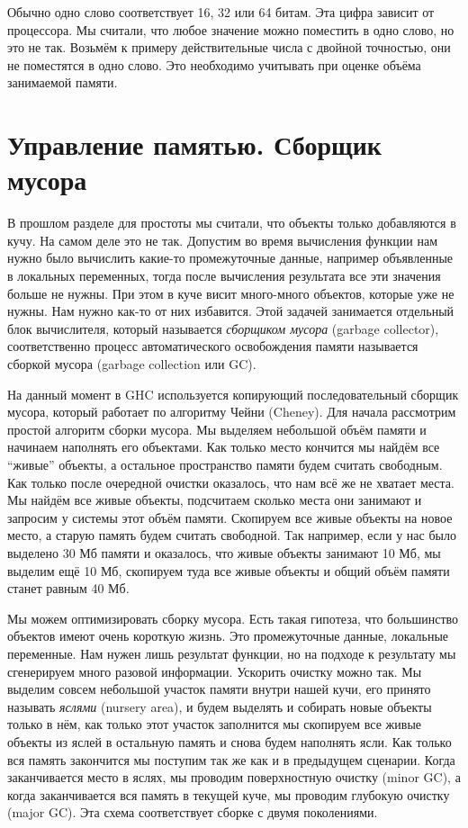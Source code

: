 Обычно одно слово соответствует 16, 32 или 64 битам. Эта цифра зависит
от процессора. Мы считали, что любое значение можно поместить в одно
слово, но это не так. Возьмём к примеру действительные числа с двойной
точностью, они не поместятся в одно слово. Это необходимо учитывать при
оценке объёма занимаемой памяти.

\section{Управление памятью. Сборщик мусора}

В прошлом разделе для простоты мы считали, что объекты только
добавляются в кучу. На самом деле это не так. Допустим во время
вычисления функции нам нужно было вычислить какие-то промежуточные
данные, например объявленные в локальных переменных, тогда после
вычисления результата все эти значения больше не нужны. При этом в куче
висит много-много объектов, которые уже не нужны. Нам нужно как-то от
них избавится. Этой задачей занимается отдельный блок вычислителя,
который называется \emph{сборщиком мусора} (garbage collector),
соответственно процесс автоматического освобождения памяти называется
сборкой мусора (garbage collection или GC).

На данный момент в GHC используется копирующий последовательный сборщик
мусора, который работает по алгоритму Чейни (Cheney). Для начала
рассмотрим простой алгоритм сборки мусора. Мы выделяем небольшой объём
памяти и начинаем наполнять его объектами. Как только место кончится мы
найдём все ``живые'' объекты, а остальное пространство памяти будем
считать свободным. Как только после очередной очистки оказалось, что нам
всё же не хватает места. Мы найдём все живые объекты, подсчитаем сколько
места они занимают и запросим у системы этот объём памяти. Скопируем все
живые объекты на новое место, а старую память будем считать свободной.
Так например, если у нас было выделено 30 Мб памяти и оказалось, что
живые объекты занимают 10 Мб, мы выделим ещё 10 Мб, скопируем туда все
живые объекты и общий объём памяти станет равным 40 Мб.

Мы можем оптимизировать сборку мусора. Есть такая гипотеза, что
большинство объектов имеют очень короткую жизнь. Это промежуточные
данные, локальные переменные. Нам нужен лишь результат функции, но на
подходе к результату мы сгенерируем много разовой информации. Ускорить
очистку можно так. Мы выделим совсем небольшой участок памяти внутри
нашей кучи, его принято называть \emph{яслями} (nursery area), и будем
выделять и собирать новые объекты только в нём, как только этот участок
заполнится мы скопируем все живые объекты из яслей в остальную память и
снова будем наполнять ясли. Как только вся память закончится мы поступим
так же как и в предыдущем сценарии. Когда заканчивается место в яслях,
мы проводим поверхностную очистку (minor GC), а когда заканчивается вся
память в текущей куче, мы проводим глубокую очистку (major GC). Эта
схема соответствует сборке с двумя поколениями.

